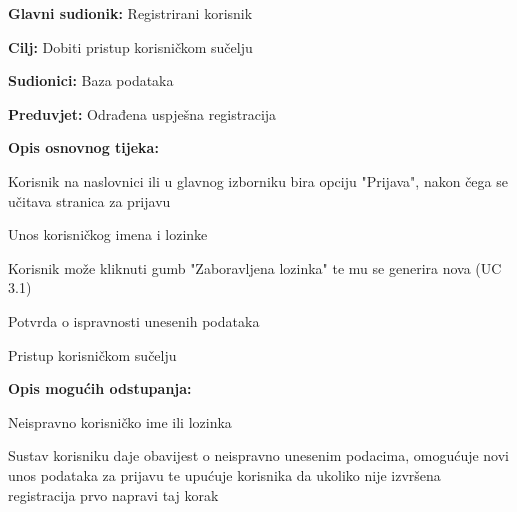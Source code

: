 					\noindent {}
					\begin{packed_item}
	
						\item \textbf{Glavni sudionik: } Registrirani korisnik
						\item  \textbf{Cilj:} Dobiti pristup korisničkom sučelju
						\item  \textbf{Sudionici:} Baza podataka
						\item  \textbf{Preduvjet:} Odrađena uspješna registracija
						\item  \textbf{Opis osnovnog tijeka:}
						
						\item[] \begin{packed_enum}

							\item Korisnik na naslovnici ili u glavnog izborniku bira opciju "Prijava", nakon čega se učitava stranica za prijavu
							\item Unos korisničkog imena i lozinke
							\item Korisnik može kliknuti gumb "Zaboravljena lozinka" te mu se generira nova (UC 3.1)
							\item Potvrda o ispravnosti unesenih podataka
							\item Pristup korisničkom sučelju
					
						\end{packed_enum}

						\item  \textbf{Opis mogućih odstupanja:}
						
						\item[] \begin{packed_item}
	
							\item[2.a]  Neispravno korisničko ime ili lozinka
							\item[] \begin{packed_enum}
								
								\item Sustav korisniku daje obavijest o neispravno unesenim podacima, omogućuje novi unos podataka za prijavu te upućuje korisnika da ukoliko nije izvršena registracija prvo napravi taj korak
								
							\end{packed_enum}
							
						\end{packed_item}
			
					\end{packed_item}
